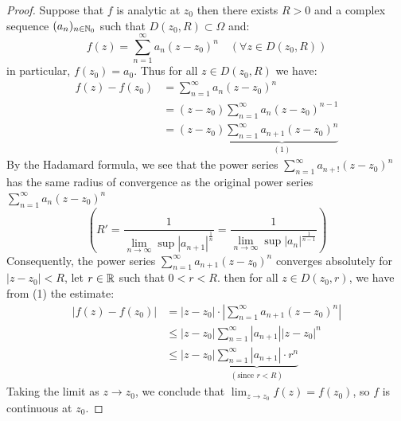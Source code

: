   \begin{proof}
  Suppose that $f $ is analytic at $z_0 $ then there exists $R > 0 $ and a complex sequence $(a_n ) _{n \in  \mathbb{N}_0} $ such
  that $D(z_0, R) \subset \Omega  $  and: 
  \[
  f(z) = 
  \sum_{n=1}^{\infty} a_n (z-z_0) ^n  \quad (\forall  z \in   D(z_0, R) ) 
  \]
  in particular, $f(z_0)  = a_0 $. Thus for all $z \in   D(z_0, R)  $ we have: 
  \begin{align*}
    f(z)  - f(z_0)  &= 
    \sum_{n=1}^{\infty} a_n (z-z_0) ^n  \\
                    &= 
                    (z-z_0) \sum_{n=1}^{\infty} a_n (z-z_0) ^{n-1} \\
                    &= (z-z_0)  
                    \underbrace{
                    \sum_{n=1}^{\infty} a_{n+1} (z-z_0) ^n 
                    }_{(1) } 
  \end{align*}
  By the Hadamard formula, we see that the power series 
  $\sum_{n=1}^{\infty} a_{n+!}(z-z_0) ^n  $ has the same 
  radius of convergence as the original power series $\sum_{n=1}^{\infty} a_n (z-z_0) ^n  $ 
  \[
  \left( R' = \frac{1}{\lim_{n \to \infty} \sup_{ } \left| a_{n+1} \right|  ^{\frac{1}{n}}} 
  = \frac{1}{\lim_{n \to \infty} \sup_{}  \left| a_n  \right|  ^{\frac{1}{n-1}}}\right)   
  \]
  Consequently, the power series $\sum_{n=1}^{\infty} a_{n+1}(z-z_0) ^n  $  converges
  absolutely for $\left| z-z_0 \right|  < R $, let $r \in  \mathbb{R}  $ such that 
  $0 <  r <  R$. then for all $z \in  D(z_0, r)  $, we have  from (1) the estimate: 
  \begin{align*}
    \left| f(z) - f(z_0)  \right|  &= 
    \left| z-z_0 \right|   
    \cdot 
    \left| \sum_{n=1}^{\infty} a_{n+1}(z-z_0) ^n  \right|  
                                \\ & \leq 
                                \left| z-z_0 \right|  \sum_{n=1}^{\infty} \left| a_{n+1} \right|  
                                \left| z-z_0 \right|  ^n \\
                                   & \leq 
                                   \left| z-z_0 \right|  
                                   \underbrace{
                                   \sum_{n=1}^{\infty} \left| a_{n+1} \right|  \cdot 
                                   r^{n}
                                   }_{(\text{since }  r <  R) } 
  \end{align*}
  Taking the limit as $z \rightarrow z_0 $, we conclude that $\lim_{z \to z_0} f(z) = f(z_0)  $, so $f $ is continuous at 
  $z_0$. 
  \end{proof}
